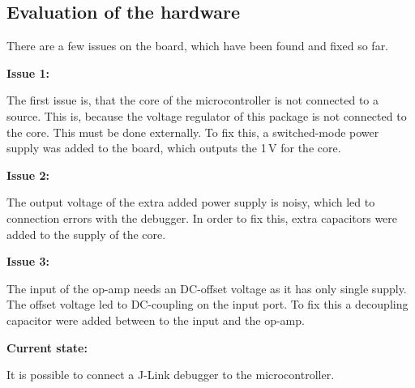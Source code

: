 \subsection{Evaluation of the hardware}

There are a few issues on the board, which have been found and fixed so far.

\textbf{Issue 1:}

The first issue is, that the core of the microcontroller is not connected to a source. This is, because
the voltage regulator of this package is not connected to the core. This must be done 
externally. To fix this, a switched-mode power supply was added to the board, which outputs the 1\,V
for the core.

\textbf{Issue 2:}

The output voltage of the extra added power supply is noisy, which led to connection errors with the debugger.
In order to fix this, extra capacitors were added to the supply of the core.

\textbf{Issue 3:}

The input of the op-amp needs an DC-offset voltage as it has only single supply. The offset voltage led
to DC-coupling on the input port. To fix this a decoupling capacitor were added between to the input and the op-amp.

\textbf{Current state:}

It is possible to connect a J-Link debugger to the microcontroller.

